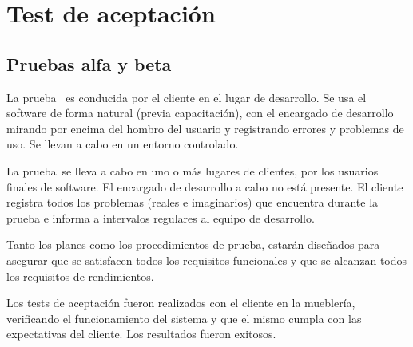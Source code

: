 \section{Test de aceptación}
\subsection{Pruebas alfa y beta}

La prueba \textalpha \, es conducida por el cliente en el lugar de desarrollo. Se usa el software de forma natural (previa capacitación), con el encargado de desarrollo mirando por encima del hombro del usuario y registrando errores y problemas de uso. Se llevan a cabo en un entorno controlado.

La prueba \textbeta \,se lleva a cabo en uno o más lugares de clientes, por los usuarios finales de software. El encargado de desarrollo a cabo no está presente. El cliente registra todos los problemas (reales e imaginarios) que encuentra durante la prueba e informa a intervalos regulares al equipo de desarrollo.

Tanto los planes como los procedimientos de prueba, estarán diseñados para asegurar que se satisfacen todos los requisitos funcionales y que se alcanzan todos los requisitos de rendimientos.

Los tests de aceptación fueron realizados con el cliente en la mueblería, verificando el funcionamiento del sistema y que el mismo cumpla con las expectativas del cliente. Los resultados fueron exitosos.